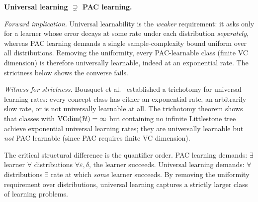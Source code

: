 \begin{separation}
\textbf{Universal learning $\supsetneq$ PAC learning.}

\medskip\noindent
\emph{Forward implication.}
Universal learnability is the \emph{weaker} requirement: it asks only for a
learner whose error decays at some rate under each distribution
\emph{separately}, whereas PAC learning demands a single sample-complexity
bound uniform over all distributions. Removing the uniformity, every
PAC-learnable class (finite VC dimension) is therefore universally
learnable, indeed at an exponential rate. The strictness below shows the
converse fails.

\medskip\noindent
\emph{Witness for strictness.}
Bousquet et al.~\cite{BousquetHannekeMoranVanHandelYehudayoff2021}
established a trichotomy for universal learning rates: every concept
class has either an exponential rate, an arbitrarily slow rate, or is
not universally learnable at all. The trichotomy theorem shows that
classes with $\mathrm{VCdim}(\mathcal{H}) = \infty$ but containing no infinite
Littlestone tree achieve exponential universal learning rates; they
are universally learnable but \emph{not} PAC learnable (since PAC
requires finite VC dimension).

The critical structural difference is the quantifier order.
PAC learning demands: $\exists$ learner $\forall$ distributions
$\forall \varepsilon, \delta$, the learner succeeds. Universal learning
demands: $\forall$ distributions $\exists$ rate at which \emph{some}
learner succeeds. By removing the uniformity requirement over
distributions, universal learning captures a strictly larger class
of learning problems.

\hfill\cite{BousquetHannekeMoranVanHandelYehudayoff2021}
\end{separation}


